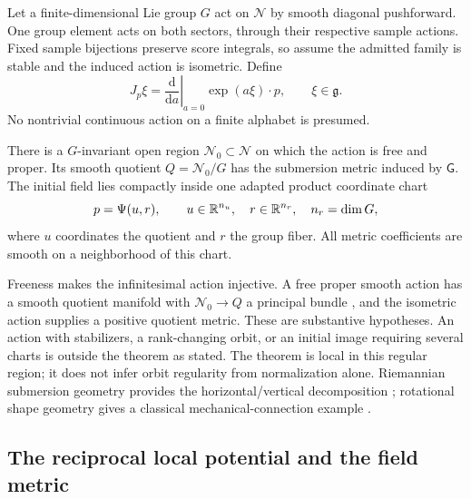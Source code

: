 Let a finite-dimensional Lie group $G$ act on $\mathcal N$ by smooth diagonal pushforward. One group element acts on both sectors, through their respective sample actions. Fixed sample bijections preserve score integrals, so assume the admitted family is stable and the induced action is isometric. Define
\begin{equation}
 J_p\xi=\left.\frac{\mathrm d}{\mathrm d a}\right|_{a=0}
                \exp(a\xi)\cdot p,\qquad \xi\in\mathfrak g.
 \label{ctx:c:eq:fundamental}
\end{equation}
No nontrivial continuous action on a finite alphabet is presumed.

There is a $G$-invariant open region $\mathcal N_0\subset\mathcal N$ on which the action is free and proper. Its smooth quotient $Q=\mathcal N_0/G$ has the submersion metric induced by $\mathsf G$. The initial field lies compactly inside one adapted product coordinate chart
\begin{equation}
 p=\Psi(u,r),\qquad u\in\mathbb R^{n_u},\quad r\in\mathbb R^{n_r},
 \quad n_r=\dim G,
 \label{ctx:c:eq:chart}
\end{equation}
where $u$ coordinates the quotient and $r$ the group fiber. All metric coefficients are smooth on a neighborhood of this chart.


Freeness makes the infinitesimal action injective. A free proper smooth action has a smooth quotient manifold with $\mathcal N_0\to Q$ a principal bundle \cite[Theorem~21.10]{Lee2013}, and the isometric action supplies a positive quotient metric. These are substantive hypotheses. An action with stabilizers, a rank-changing orbit, or an initial image requiring several charts is outside the theorem as stated. The theorem is local in this regular region; it does not infer orbit regularity from normalization alone. Riemannian submersion geometry provides the horizontal/vertical decomposition \cite{ONeill1966}; rotational shape geometry gives a classical mechanical-connection example \cite{LittlejohnReinsch1997}.

\subsection{The reciprocal local potential and the field metric}

